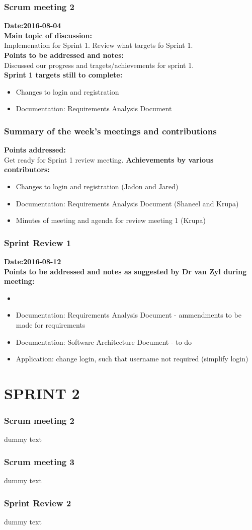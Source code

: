 \documentclass[12pt]{article}
\begin{document}
\subsubsection{Scrum meeting 2}
\textbf{Date:2016-08-04}\\
\textbf{Main topic of discussion:}\\
Implemenation for Sprint 1. Review what targets fo Sprint 1.\\
\textbf{Points to be addressed and notes:}\\
Discussed our progress and tragets/achievements for sprint 1.\\
\textbf{Sprint 1 targets still to complete:} \\
\begin{itemize}
\item Changes to login and registration
\item Documentation: Requirements Analysis Document
\end{itemize}
\subsubsection{Summary of the week's meetings and contributions}
\textbf{Points addressed:} \\
Get ready for Sprint 1 review meeting.
\textbf{Achievements by various contributors:}
\begin{itemize}
\item Changes to login and registration (Jadon and Jared)
\item Documentation: Requirements Analysis Document (Shaneel and Krupa)
\item Minutes of meeting and agenda for review meeting 1 (Krupa)
\end{itemize}

\subsubsection{Sprint Review 1}
\textbf{Date:2016-08-12}\\
\textbf{Points to be addressed and notes as suggested by Dr van Zyl during meeting:}\\
\begin{itemize}
\item 
\item Documentation: Requirements Analysis Document - ammendments to be made for requirements
\item Documentation: Software Architecture Document - to do
\item Application: change login, such that username not required (simplify login)
\end{itemize} 


\section{SPRINT 2}
\subsubsection{Scrum meeting 2}
dummy text
\subsubsection{Scrum meeting 3}
dummy text
\subsubsection{Sprint Review 2}
dummy text
\end{document}

